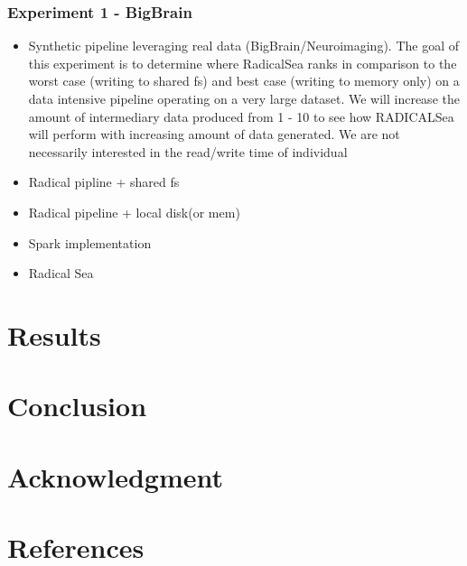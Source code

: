 \documentclass[conference]{IEEEtran}
\begin{document}
    \subsubsection{Experiment 1 - BigBrain}
    \begin{itemize}
            \item Synthetic pipeline leveraging real data (BigBrain/Neuroimaging). The goal of this experiment is to determine
            where RadicalSea ranks in comparison to the worst case (writing to shared fs) and best case (writing to memory only) on
            a data intensive pipeline operating on a very large dataset. 
            We will increase the amount of intermediary data produced from 1 - 10 to see how RADICALSea will perform with increasing amount of data generated.
            We are not necessarily interested in the read/write time of individual
            \item Radical pipline + shared fs
            \item Radical pipeline + local disk(or mem)
            \item Spark implementation
            \item Radical Sea
    \end{itemize}

\section{Results}
\section{Conclusion}

\section*{Acknowledgment}

\section*{References}
\end{document}
